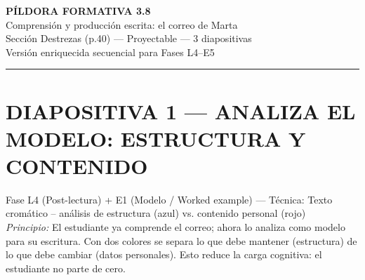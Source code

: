 \documentclass[a4paper,11pt]{article}
\begin{document}
\begin{center}
{\LARGE\textbf{PÍLDORA FORMATIVA 3.8}}\\[0.3cm]
{\Large Comprensión y producción escrita: el correo de Marta}\\[0.2cm]
{\normalsize Sección Destrezas (p.40) — Proyectable — 3 diapositivas}\\[0.2cm]
{\small Versión enriquecida secuencial para Fases L4--E5}
\end{center}

\vspace{0.5cm}

\noindent{}

\vspace{0.8cm}


\noindent\textcolor{violeta}{\rule{\linewidth}{2.5pt}}

\section*{DIAPOSITIVA 1 — ANALIZA EL MODELO: ESTRUCTURA Y CONTENIDO}

{\small Fase L4 (Post-lectura) + E1 (Modelo / Worked example) — Técnica: Texto cromático -- análisis de estructura (azul) vs. contenido personal (rojo)}\\
{\small\textit{Principio:} El estudiante ya comprende el correo; ahora lo analiza como modelo para su escritura. Con dos colores se separa lo que debe mantener (estructura) de lo que debe cambiar (datos personales). Esto reduce la carga cognitiva: el estudiante no parte de cero.}
\end{document}
